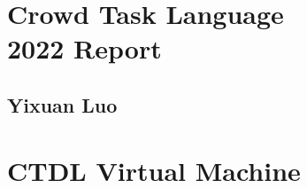 \documentclass[10pt, oneside]{book}
\begin{document}
\frontmatter
%
\chapter*{\Huge \center Crowd Task Language \\ 2022 Report}
\thispagestyle{empty}
\section*{\huge \center Yixuan Luo}
%
\tableofcontents
%
\mainmatter







\chapter{CTDL Virtual Machine}

\appendix

\backmatter
\end{document}
